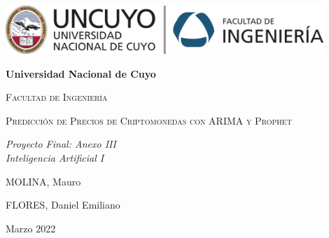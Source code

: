 \documentclass[a4paper,10pt]{article}
\begin{document}
\begin{titlepage}
\centering
{\includegraphics[width=0.9\textwidth]{fing_uncuyo}\par}
\vspace{1cm}
{\bfseries\LARGE Universidad Nacional de Cuyo \par}
\vspace{1cm}
{\scshape\Large Facultad de Ingeniería \par}
\vspace{3cm}
{\scshape\Huge Predicción de Precios de Criptomonedas con ARIMA y Prophet \par}
\vspace{3cm}
{\itshape\Large Proyecto Final: Anexo III\\Inteligencia Artificial I \par}
\vfill
{\Large MOLINA, Mauro \par}
{\Large FLORES, Daniel Emiliano \par}
\vfill
{\Large Marzo 2022 \par}
\end{titlepage}

\newpage
\end{document}
